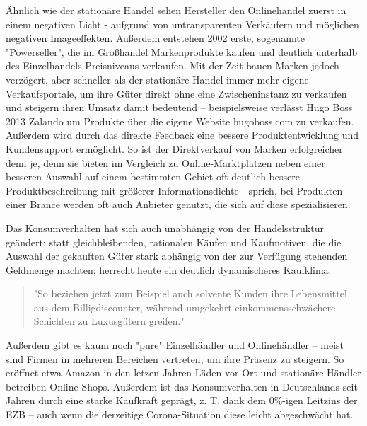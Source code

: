 
Ähnlich wie der stationäre Handel sehen Hersteller den Onlinehandel zuerst in einem negativen Licht - aufgrund von untransparenten Verkäufern und möglichen negativen Imageeffekten\cite[S. 20]{Graf}. Außerdem entstehen 2002 erste, sogenannte "Powerseller", die im Großhandel Markenprodukte kaufen und deutlich unterhalb des Einzelhandels-Preisniveaus verkaufen\cite[S. 26]{Graf}. Mit der Zeit bauen Marken jedoch verzögert, aber schneller als der stationäre Handel immer mehr eigene Verkaufsportale, um ihre Güter direkt ohne eine Zwischeninstanz zu verkaufen und steigern ihren Umsatz damit bedeutend – beispielsweise verlässt Hugo Boss 2013 Zalando um Produkte über die eigene Website hugoboss.com zu verkaufen\cite[S. 48f]{Graf}. Außerdem wird durch das direkte Feedback eine bessere Produktentwicklung und Kundensupport ermöglicht\cite[S. 39]{Graf}. So ist der Direktverkauf von Marken erfolgreicher denn je, denn sie bieten im Vergleich zu Online-Marktplätzen neben einer besseren Auswahl auf einem bestimmten Gebiet oft deutlich bessere Produktbeschreibung mit größerer Informationsdichte - sprich, bei Produkten einer Brance werden oft auch Anbieter genutzt, die sich auf diese spezialisieren\cite[S. 18f]{evilcom}.


Das Konsumverhalten hat sich auch unabhängig von der Handelsstruktur geändert: statt gleichbleibenden, rationalen Käufen und Kaufmotiven, die die Auswahl der gekauften Güter stark abhängig von der zur Verfügung stehenden Geldmenge machten\cite[S. 38]{Schramm}; herrscht heute ein deutlich dynamischeres Kaufklima:
\begin{quote}
"So beziehen jetzt zum Beispiel auch solvente Kunden ihre Lebensmittel aus dem Billigdiscounter, während  umgekehrt  einkommensschwächere  Schichten  zu  Luxusgütern  greifen."\cite[S. 43]{Nitt}
\end{quote}
Außerdem gibt es kaum noch "pure" Einzelhändler und Onlinehändler – meist sind Firmen in mehreren Bereichen vertreten, um ihre Präsenz zu steigern. So eröffnet etwa Amazon in den letzen Jahren Läden vor Ort und stationäre Händler betreiben Online-Shops\cite[S. 50]{Graf}.
Außerdem ist das Konsumverhalten in Deutschlands seit Jahren durch eine starke Kaufkraft geprägt, z. T. dank dem 0\%-igen Leitzins der \ac{EZB}\cite[S. 49]{Ebert} – auch wenn die derzeitige Corona-Situation diese leicht abgeschwächt hat\cite{BfWE}. 




\iffalse 

